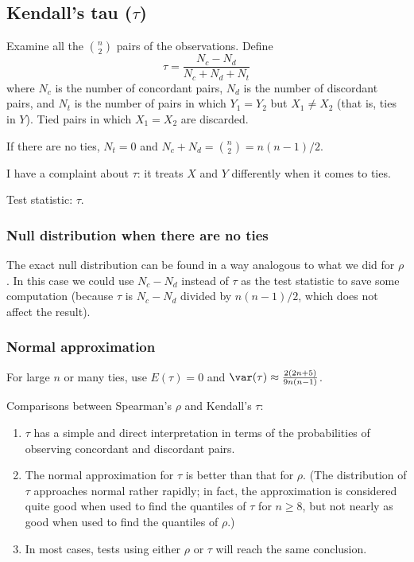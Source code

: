 \documentclass[12pt]{article}
\begin{document}
\subsection{Kendall's tau ($\tau$)}

Examine all the $n\choose 2$ pairs of the observations.
Define
\[
\tau = \frac{N_c - N_d}{N_c + N_d + N_t}
\]
where
$N_c$ is the number of concordant pairs,
$N_d$ is the number of discordant pairs,
and
$N_t$ is the number of pairs in which $Y_1 = Y_2$ but
$X_1 \ne X_2$ (that is, ties in $Y$).
Tied pairs in which $X_1 = X_2$ are discarded.

If there are no ties,
$N_t = 0$ and $N_c + N_d = {n\choose 2} = n(n-1)/2$.

I have a complaint about $\tau$: it treats $X$ and $Y$ differently when it
comes to ties.

Test statistic: $\tau$.

\subsubsection{Null distribution when there are no ties}

The exact null distribution can be found in a way analogous to what we
did for $\rho$.
In this case we could use $N_c - N_d$ instead of $\tau$ as the test
statistic to save some computation (because $\tau$ is $N_c - N_d$
divided by $n(n-1)/2$, which does not affect the result).

\subsubsection{Normal approximation}

For large $n$ or many ties,
use
$E(\tau) = 0$ and
$\var(\tau) \approx \frac{2(2n+5)}{9n(n-1)}$.

\remark Comparisons between Spearman's $\rho$ and Kendall's $\tau$:
\begin{enumerate}
\item $\tau$ has a simple and direct interpretation in terms of the
    probabilities of observing concordant and discordant pairs.
\item The normal approximation for $\tau$ is better than that for
    $\rho$.
    (The distribution of $\tau$ approaches normal rather rapidly;
    in fact, the approximation is considered quite good when used to
    find the quantiles of $\tau$ for $n\ge 8$, but not nearly as good
    when used to find the quantiles of $\rho$.)
\item In most cases, tests using either $\rho$ or $\tau$ will reach the
same conclusion.
\end{enumerate}
\end{document}
